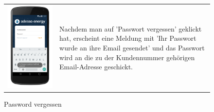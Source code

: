 \begin{figure}[h]
\begin{tabularx}{\textwidth}{X  X}
	\includegraphics[scale = 0.155]{img/AndroidMockup/forgotPassword} \caption{Password vergessen} & Nachdem man auf 'Passwort vergessen' geklickt hat, erscheint eine Meldung mit 'Ihr Passwort wurde an ihre Email gesendet' und das Passwort wird an die zu der Kundennummer gehörigen Email-Adresse geschickt. \\

\end{tabularx}
\end{figure}
